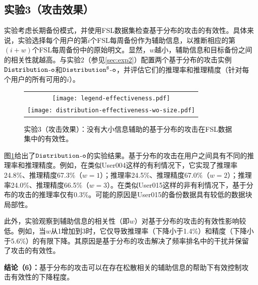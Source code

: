 \subsection{实验3（攻击效果）} 

实验考虑长期备份模式，并使用FSL数据集检查基于分布的攻击的有效性。具体来说，实验选择每个用户的第$i$个FSL每周备份作为辅助信息，以推断相应的第$(i+w)$个FSL每周备份中的原始明文。显然，$w$越小，辅助信息和目标备份之间的相关性就越高。与实验2（参见\ref{sec:exp2}）配置两个基于分布的攻击实例$\tt Distribution$-$\tt o$和$\tt Distribution^S$-$\tt o$，并评估它们的推理率和推理精度（针对每个用户的所有可用的$i$）。

\begin{figure}[!htbp]
    \centering
    \centering
    \begin{tabular}{c}
        \texttt{[image: legend-effectiveness.pdf]}\\
        \texttt{[image: distribution-effectiveness-wo-size.pdf]}
    \end{tabular}
	\caption{实验3（攻击效果）：没有大小信息辅助的基于分布的攻击在FSL数据集中的有效性。}
	\label{fig:experiment-distribution-effectiveness-wo}
\end{figure}

图\ref{fig:experiment-distribution-effectiveness-wo}给出了$\tt Distribution$-$\tt o$的实验结果。基于分布的攻击在用户之间具有不同的推理率和推理精度。例如，在类似User004这样的有利情况下，它实现了推理率24.8\%、推理精度67.3\%（$w = 1$）；推理率24.5\%、推理精度67.0\%（$w = 2$）；推理率24.0\%、推理精度66.5\%（$w = 3$）。在类似User015这样的非有利情况下，基于分布的攻击的推理率仅有0.3\%。可能的原因是User015的备份数据具有较低的数据块局部性。

此外，实验观察到辅助信息的相关性（即$w$）对基于分布的攻击的有效性影响较低。例如，当$w$从1增加到3时，它仅导致推理率（下降小于1.4\%）和精度（下降小于5.6\%）的有限下降。其原因是基于分布的攻击解决了频率排名中的干扰并保留了攻击的有效性。

\textbf{结论（6）：}基于分布的攻击可以在存在松散相关的辅助信息的帮助下有效控制攻击有效性的下降程度。

